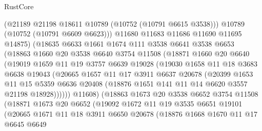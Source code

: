 \begin{lexlean}{RustCore}
\begin{coremodule}
                  (@21189 @21198 @18611 @10789 (@10752 (@10791 @6615 @3538)))
                  @10789
                  (@10752 (@10791 @6609 @6623)))
                @11680
                @11683
                @11686
                @11690
                @11695
                @14875)
              (@18635
                @6633
                @1661
                @1674
                @111
                @3538
                @6641
                @3538
                @6653
                (@18863
                  @1660
                  @20
                  @3538
                  @6640
                  @3754
                  @11508
                  (@18871
                    @1660
                    @20
                    @6640
                    (@19019
                      @1659
                      @11
                      @19
                      @3757
                      @6639
                      @19028
                      (@19030
                        @1658
                        @11
                        @18
                        @3683
                        @6638
                        @19043
                        (@20665
                          @1657
                          @11
                          @17
                          @3911
                          @6637
                          @20678
                          (@20399
                            @1653
                            @11
                            @15
                            @5359
                            @6636
                            @20408
                            (@18876 @1651 @141 @11 @14 @6620 @3557 @21198 @18928))))))
                  @11608)
                (@18863
                  @1673
                  @20
                  @3538
                  @6652
                  @3754
                  @11508
                  (@18871
                    @1673
                    @20
                    @6652
                    (@19092
                      @1672
                      @11
                      @19
                      @3535
                      @6651
                      @19101
                      (@20665
                        @1671
                        @11
                        @18
                        @3911
                        @6650
                        @20678
                        (@18876
                          @1668
                          @1670
                          @11
                          @17
                          @6645
                          @6649

\end{coremodule}
\end{lexlean}

